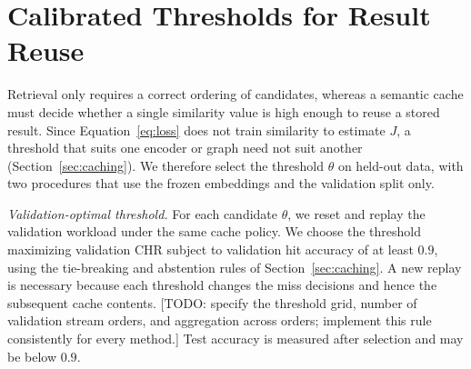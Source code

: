 \documentclass[runningheads]{llncs}
\newcommand{\hp}[1]{{\color{red!75!black}#1}}
\begin{document}



\clearpage
\section{Calibrated Thresholds for Result Reuse}
\label{app:calibration}

Retrieval only requires a correct ordering of candidates, whereas a semantic
cache must decide whether a single similarity value is high enough to reuse a
stored result. Since Equation~\ref{eq:loss} does not train similarity to estimate $J$,
a threshold that suits one encoder or graph need not suit another
(Section~\ref{sec:caching}). We therefore select the threshold $\theta$ on
held-out data, with two procedures that use the frozen embeddings and the
validation split only.

\emph{Validation-optimal threshold.} For each candidate $\theta$, we reset
and replay the validation workload under the same cache policy. We choose the
threshold maximizing validation CHR subject to validation hit accuracy of at
least $0.9$, using the tie-breaking and abstention rules of
Section~\ref{sec:caching}. A new replay is necessary because each threshold
changes the miss decisions and hence the subsequent cache contents.
\hp{[TODO: specify the threshold grid, number of validation stream orders,
and aggregation across orders; implement this rule consistently for every
method.]} Test accuracy is measured after selection and may be below $0.9$.
\end{document}

